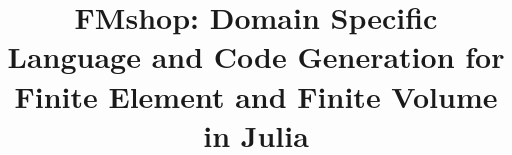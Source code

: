 \documentclass[twoside,leqno,twocolumn]{article}
\begin{document}
%



\title{\Large FMshop: Domain Specific Language and Code Generation for Finite Element and Finite Volume in Julia}

\date{}

\maketitle






\end{document}
